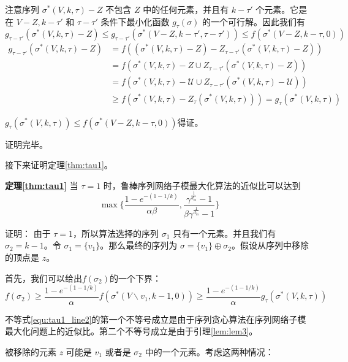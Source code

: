 注意序列 $\sigma^*(V,k,\tau) - Z$ 不包含 $Z$ 中的任何元素，并且有 $k-\tau'$ 个元素。它是在 $V-Z,k-\tau'$ 和 $\tau-\tau'$ 条件下最小化函数 $g_\tau(\sigma)$ 的一个可行解。因此我们有
\begin{equation}
g_{\tau-\tau'}(\sigma^*(V,k,\tau) - Z)  \le g_{\tau-\tau'}(\sigma^*(V-Z,k-\tau',\tau-\tau')) \le f(\sigma^*(V-Z,k-\tau,0))
\end{equation}
\begin{align}
    g_{\tau-\tau'}(\sigma^*(V,k,\tau) - Z) & = f((\sigma^*(V,k,\tau) - Z) - Z_{\tau-\tau'}(\sigma^*(V,k,\tau) - Z)) \\
    & = f(\sigma^*(V,k,\tau) - Z \cup Z_{\tau-\tau'}(\sigma^*(V,k,\tau) - Z)) \\
    & = f(\sigma^*(V,k,\tau) - \mathcal{U} \cup Z_{\tau-\tau'}(\sigma^*(V,k,\tau) - \mathcal{U})) \\
    & \ge f(\sigma^*(V,k,\tau) - Z_{\tau}(\sigma^*(V,k,\tau))) = g_{\tau}(\sigma^*(V,k,\tau))
\end{align}

$g_{\tau}(\sigma^*(V,k,\tau)) \le f(\sigma^*(V-Z,k-\tau,0))$得证。

\noindent 证明完毕。

接下来证明定理\ref{thm:tau1}。

\noindent \textbf{定理\ref{thm:tau1}} 当 $\tau=1$ 时，鲁棒序列网络子模最大化算法的近似比可以达到
\begin{equation*}
\max\{\frac{1-e^{-(1-1/k)}}{\alpha\beta},\frac{\gamma^{\frac{1}{d_{\text{in}}}}-1}{\beta \gamma^{\frac{1}{d_{\text{in}}}}-1}\}\end{equation*}

\noindent 证明：
由于 $\tau=1$，所以算法选择的序列 $\sigma_1$ 只有一个元素。并且我们有 $\sigma_2=k-1$。令 $\sigma_1=\{v_1\}$。那么最终的序列为 $\sigma= \{v_1\} \oplus \sigma_2$。假设从序列中移除的顶点是 $z$。

首先，我们可以给出$f(\sigma_2)$的一个下界：
\begin{equation}
    f(\sigma_2)  \ge \frac{1-e^{-(1-1/k)}}{\alpha} f(\sigma^*(V\backslash v_1,k-1,0))
     \ge \frac{1-e^{-(1-1/k)}}{\alpha} g_\tau(\sigma^*(V,k,\tau)) \label{equ:tau1_line2}
\end{equation}

不等式\ref{equ:tau1_line2}的第一个不等号成立是由于序列贪心算法在序列网络子模最大化问题上的近似比\cite{mitrovic2018submodularity}。第二个不等号成立是由于引理\ref{lem:lem3}。

被移除的元素 $z$ 可能是 $v_1$ 或者是 $\sigma_2$ 中的一个元素。考虑这两种情况：

